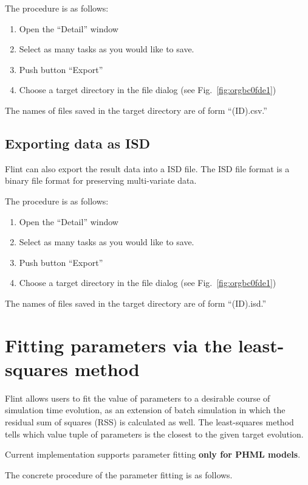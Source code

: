 \documentclass[a4paper,10pt]{report}
\begin{document}
The procedure is as follows:

\begin{enumerate}
\item Open the ``Detail'' window
\item Select as many tasks as you would like to save.
\item Push button ``Export''
\item Choose a target directory in the file dialog (see Fig.~\ref{fig:orgbc0fde1})
\end{enumerate}

The names of files saved in the target directory are of form ``(ID).csv.''

\subsection{Exporting data as ISD}
\label{sec:org2ee86d6}
Flint can also export the result data into a ISD file.
The ISD file format is a binary file format for preserving multi-variate data.

The procedure is as follows:

\begin{enumerate}
\item Open the ``Detail'' window
\item Select as many tasks as you would like to save.
\item Push button ``Export''
\item Choose a target directory in the file dialog (see Fig.~\ref{fig:orgbc0fde1})
\end{enumerate}

The names of files saved in the target directory are of form ``(ID).isd.''

\section{Fitting parameters via the least-squares method}
\label{sec:org754cfb8}
Flint allows users to fit the value of parameters to a desirable course of
simulation time evolution, as an extension of batch simulation in which
the residual sum of squares (RSS) is calculated as well. The least-squares
method tells which value tuple of parameters is the closest to the given
target evolution.

Current implementation supports parameter fitting \textbf{only for PHML models}.

The concrete procedure of the parameter fitting is as follows.
\end{document}
